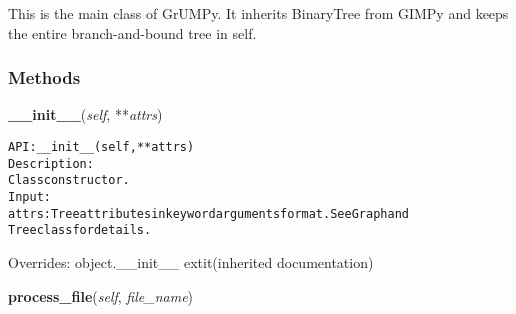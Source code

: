 This is the main class of GrUMPy. It inherits BinaryTree from GIMPy and 
keeps the entire branch-and-bound tree in self.



  \subsubsection{Methods}

    \vspace{0.5ex}

\hspace{.8\funcindent}\begin{boxedminipage}{\funcwidth}

    \raggedright \textbf{\_\_init\_\_}(\textit{self}, **\textit{attrs})

\setlength{\parskip}{2ex}
\begin{alltt}

API: \_\_init\_\_(self, **attrs)
Description:
    Class constructor.
Input:
    attrs: Tree attributes in keyword arguments format. See Graph and
    Tree class for details.
\end{alltt}

\setlength{\parskip}{1ex}
      Overrides: object.\_\_init\_\_ 	extit{(inherited documentation)}

    \end{boxedminipage}

    \label{coinor:grumpy:BB:BBTree:process_file}

    \vspace{0.5ex}

\hspace{.8\funcindent}\begin{boxedminipage}{\funcwidth}

    \raggedright \textbf{process\_file}(\textit{self}, \textit{file\_name})

\setlength{\parskip}{2ex}
\setlength{\parskip}{1ex}
    \end{boxedminipage}

    \label{coinor:grumpy:BB:BBTree:write_as_dynamic_gexf}

